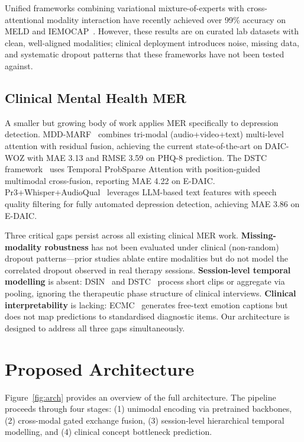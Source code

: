 \documentclass{article}
\begin{document}
Unified frameworks combining variational mixture-of-experts with cross-attentional
modality interaction have recently achieved over 99\% accuracy on MELD and
IEMOCAP~\cite{unifiedmer2025}. However, these results are on curated lab datasets with
clean, well-aligned modalities; clinical deployment introduces noise, missing data,
and systematic dropout patterns that these frameworks have not been tested against.

\subsection{Clinical Mental Health MER}

A smaller but growing body of work applies MER specifically to depression detection.
MDD-MARF~\cite{zhou2025mddmarf} combines tri-modal (audio+video+text) multi-level
attention with residual fusion, achieving the current state-of-the-art on DAIC-WOZ with
MAE 3.13 and RMSE 3.59 on PHQ-8 prediction. The DSTC
framework~\cite{dstc2025} uses Temporal ProbSparse Attention with position-guided
multimodal cross-fusion, reporting MAE 4.22 on E-DAIC. Pr3+Whisper+AudioQual~\cite{sadeghi2024}
leverages LLM-based text features with speech quality filtering for fully automated
depression detection, achieving MAE 3.86 on E-DAIC.

Three critical gaps persist across all existing clinical MER work. \textbf{Missing-modality
robustness} has not been evaluated under clinical (non-random) dropout patterns---prior
studies ablate entire modalities but do not model the correlated dropout observed in
real therapy sessions. \textbf{Session-level temporal modelling} is absent: DSIN~\cite{dsin2025}
and DSTC~\cite{dstc2025} process short clips or aggregate via pooling, ignoring the
therapeutic phase structure of clinical interviews. \textbf{Clinical interpretability}
is lacking: ECMC~\cite{ecmc2026} generates free-text emotion captions but does not map
predictions to standardised diagnostic items. Our architecture is designed to address
all three gaps simultaneously.


\section{Proposed Architecture}
\label{sec:method}

Figure~\ref{fig:arch} provides an overview of the full architecture. The pipeline
proceeds through four stages: (1) unimodal encoding via pretrained backbones,
(2) cross-modal gated exchange fusion, (3) session-level hierarchical temporal modelling,
and (4) clinical concept bottleneck prediction.
\end{document}
